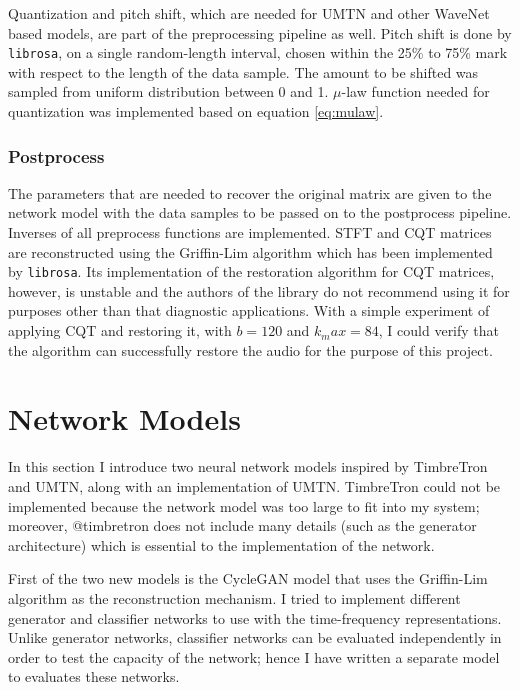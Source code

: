 \documentclass[12pt,a4paper,]{report}
\begin{document}
Quantization and pitch shift, which are needed for UMTN and other
WaveNet based models, are part of the preprocessing pipeline as well.
Pitch shift is done by \texttt{librosa}, on a single random-length
interval, chosen within the 25\% to 75\% mark with respect to the length
of the data sample. The amount to be shifted was sampled from uniform
distribution between 0 and 1. \(\mu\)-law function needed for
quantization was implemented based on equation \ref{eq:mulaw}.

\hypertarget{postprocess}{%
\subsubsection{Postprocess}\label{postprocess}}

The parameters that are needed to recover the original matrix are given
to the network model with the data samples to be passed on to the
postprocess pipeline. Inverses of all preprocess functions are
implemented. STFT and CQT matrices are reconstructed using the
Griffin-Lim algorithm which has been implemented by \texttt{librosa}.
Its implementation of the restoration algorithm for CQT matrices,
however, is unstable and the authors of the library do not recommend
using it for purposes other than that diagnostic applications. With a
simple experiment of applying CQT and restoring it, with \(b = 120\) and
\(k_max = 84\), I could verify that the algorithm can successfully
restore the audio for the purpose of this project.

\hypertarget{network-models}{%
\section{Network Models}\label{network-models}}

In this section I introduce two neural network models inspired by
TimbreTron and UMTN, along with an implementation of UMTN. TimbreTron
could not be implemented because the network model was too large to fit
into my system; moreover, @timbretron does not include many details
(such as the generator architecture) which is essential to the
implementation of the network.

First of the two new models is the CycleGAN model that uses the
Griffin-Lim algorithm as the reconstruction mechanism. I tried to
implement different generator and classifier networks to use with the
time-frequency representations. Unlike generator networks, classifier
networks can be evaluated independently in order to test the capacity of
the network; hence I have written a separate model to evaluates these
networks.
\end{document}
